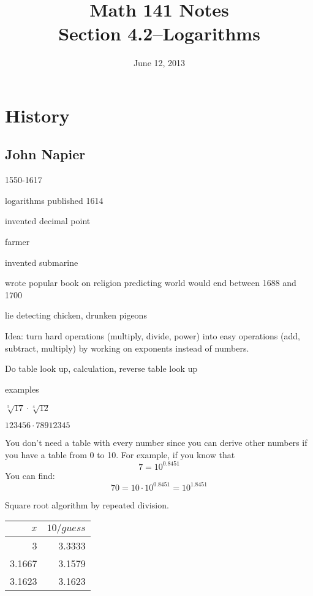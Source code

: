 \documentclass{exam}
\title{Math 141 Notes \\ Section 4.2--Logarithms}
\date{June 12, 2013}
\begin{document}
  \maketitle
  \tableofcontents

  \section{History}
  \subsection{John Napier}

  \begin{itemize*}
    \item 1550-1617
    \item logarithms published 1614
    \item invented decimal point
    \item farmer
    \item invented submarine
    \item wrote popular book on religion predicting world would end between 1688 and 1700
    \item lie detecting chicken, drunken pigeons
  \end{itemize*}

  Idea: turn hard operations (multiply, divide, power) into easy operations (add, subtract, multiply) by working on
  exponents instead of numbers.

  Do table look up, calculation, reverse table look up

  examples 
  \begin{itemize*}
    \item $\sqrt[5]{17} \cdot \sqrt[4]{12}$
    \item $123456 \cdot 78912345$
  \end{itemize*}

  You don't need a table with every number since you can derive other numbers if you have a table from 0 to 10.  For
  example, if you know that 
  \[
    7 = 10^{0.8451}
  \]
  You can find:
  \[
    70 = 10 \cdot 10^{0.8451} = 10^{1.8451}
  \]

  Square root algorithm by repeated division.

  \begin{tabular}[H]{rr}
    \toprule
    $x$    & $10/guess$ \\
    \midrule
    3      & 3.3333 \\
    3.1667 & 3.1579 \\
    3.1623 & 3.1623 \\
    \bottomrule
  \end{tabular}
\end{document}
